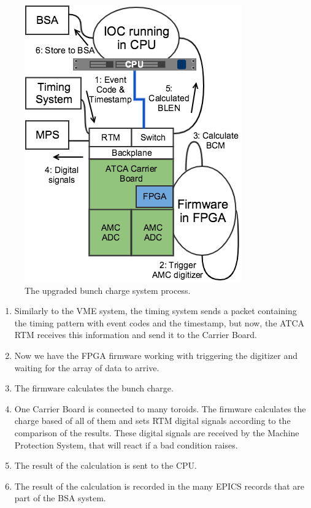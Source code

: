 \documentclass[letter,
               biblatex,     %
               keeplastbox,   %
               ]{jacow}
\begin{document}
\begin{figure}[!htb]
   \centering
   \includegraphics*[width=\columnwidth]{BCM_ATCA_Process}
   \caption{The upgraded bunch charge system process.}
   \label{fig:bcm_atca}
\end{figure}

\begin{enumerate}
   \item Similarly to the VME system, the timing system sends a packet containing the timing pattern with event codes and the timestamp, but now, the ATCA RTM receives this information and send it to the Carrier Board.
   \item Now we have the FPGA firmware working with triggering the digitizer and waiting for the array of data to arrive.
   \item The firmware calculates the bunch charge.
   \item One Carrier Board is connected to many toroids. The firmware calculates the charge based of all of them and sets RTM digital signals according to the comparison of the results. These digital signals are received by the Machine Protection System, that will react if a bad condition raises.
   \item The result of the calculation is sent to the CPU.
   \item The result of the calculation is recorded in the many EPICS records that are part of the BSA system.
\end{enumerate}
\end{document}

